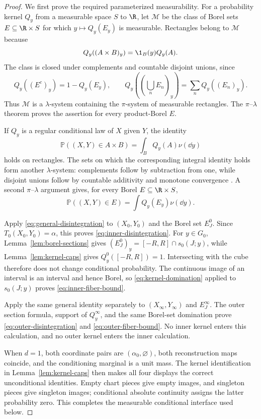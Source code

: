 \begin{proof}
We first prove the required parameterized measurability.  For a probability
kernel $Q_y$ from a measurable space $S$ to $\R$, let $\mathcal M$ be the
class of Borel sets $E\subseteq\R\times S$ for which
$y\mapsto Q_y(E_y)$ is measurable.  Rectangles belong to $\mathcal M$
because
\[
Q_y((A\times B)_y)=\1_B(y)Q_y(A).
\]
The class is closed under complements and countable disjoint unions, since
\[
Q_y((E^c)_y)=1-Q_y(E_y),\qquad
Q_y\left(\left(\bigcup_nE_n\right)_y\right)=\sum_nQ_y((E_n)_y).
\]
Thus $\mathcal M$ is a $\lambda$-system containing the $\pi$-system of
measurable rectangles.  The $\pi$--$\lambda$ theorem
\cite[Lemma~1.1]{Kallenberg2002} proves the assertion
for every product-Borel $E$.

If $Q_y$ is a regular conditional law of $X$ given $Y$, the identity
\[
\mathbb P((X,Y)\in A\times B)=\int_BQ_y(A)\nu(\dd y)
\]
holds on rectangles.  The sets on which the corresponding integral identity
holds form another $\lambda$-system: complements follow by subtraction from
one, while disjoint unions follow by countable additivity and monotone
convergence \cite[Theorem~2.14]{Folland1999}.  A second $\pi$--$\lambda$
argument \cite[Lemma~1.1]{Kallenberg2002} gives, for every Borel
$E\subseteq\R\times S$,
\begin{equation}
\mathbb P((X,Y)\in E)=\int Q_y(E_y)\nu(\dd y).
\label{eq:general-disintegration}
\end{equation}

Apply \eqref{eq:general-disintegration} to $(X_0,Y_0)$ and the Borel set
$E^0_J$.  Since $T_0(X_0,Y_0)=\alpha$, this proves
\eqref{eq:inner-disintegration}.  For $y\in G_0$,
Lemma~\ref{lem:borel-sections} gives
$(E^0_J)_y=[-R,R]\cap s_0(J;y)$, while Lemma~\ref{lem:kernel-caps} gives
$Q^0_y([-R,R])=1$.  Intersecting with the cube therefore does not change
conditional probability.  The continuous image of an interval is an
interval and hence Borel, so \eqref{eq:kernel-domination} applied to
$s_0(J;y)$ proves \eqref{eq:inner-fiber-bound}.

Apply the same general identity separately to $(X_\infty,Y_\infty)$ and
$E^\infty_J$.  The outer section formula, support of $Q^\infty_y$, and the
same Borel-set domination prove \eqref{eq:outer-disintegration} and
\eqref{eq:outer-fiber-bound}.  No inner kernel enters this calculation, and
no outer kernel enters the inner calculation.

When $d=1$, both coordinate pairs are $(\alpha_0,\varnothing)$, both
reconstruction maps coincide, and the conditioning marginal is a unit mass.
The kernel identification in Lemma~\ref{lem:kernel-caps} then makes all four
displays the correct unconditional identities.  Empty chart pieces give
empty images, and singleton pieces give singleton images; conditional
absolute continuity assigns the latter probability zero.  This completes
the measurable conditional interface used below.
\end{proof}

